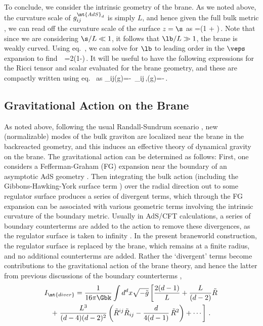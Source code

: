 To conclude, we consider the intrinsic geometry of the brane. As we noted above, the curvature scale of $g_{ij}^{\mt{AdS}_d}$ is simply $L$, and hence given the full bulk metric , we can read off the curvature scale of the surface $z=\s$ as
\beq\label{curve1}
\lb=\left(1 + \right)\,.
\eeq
Note that since we are considering $\s/L\ll 1$, it follows that
$\lb/L\gg 1$, \ie the brane is weakly curved. Using eq.~, we can solve for $\lb$ to leading order in the $\veps$ expansion to find
\beq\label{curve2}
\,\veps\ =2\left(1-\right)\,.
\eeq
It will be useful to have the following expressions for the Ricci tensor and scalar evaluated for the brane geometry, and these are compactly written using eq.~ as
\beq\label{Ricky2}
_{ij}(\tilde g)=-\, _{ij}\,,\qquad {}(\tilde g)=-\,.
\eeq




\subsection{Gravitational Action on the Brane}\label{indyaction}


As noted above, following the usual Randall-Sundrum scenario \cite{Randall:1999vf,Randall:1999ee,Karch:2000ct}, new (normalizable) modes of the bulk graviton are localized near the brane in the backreacted geometry, and this induces an effective theory of dynamical gravity on the brane. The gravitational action can be determined as follows:
First, one considers  a Fefferman-Graham (FG) expansion near the boundary of an asymptotic AdS geometry \cite{FG,Fefferman:2007rka}. Then integrating the bulk action (including the Gibbons-Hawking-York surface term \cite{PhysRevLett.28.1082,Gibbons:1976ue}) over the radial direction out to some regulator surface produces a series of divergent terms, which through the FG expansion can be associated with various geometric terms involving the intrinsic curvature of the boundary metric. Usually in AdS/CFT calculations, a series of boundary counterterms are added to the action to remove these divergences, as the regulator surface is taken to infinity \cite{Emparan:1999pm}. In the present braneworld construction, the regulator surface is replaced by the brane, which remains at a finite radius, and no additional counterterms are added. Rather the `divergent' terms become contributions to the gravitational action of the brane theory, and hence the latter from previous discussions of the boundary counterterms \cite{Emparan:1999pm}, \ie
\begin{multline}\label{diver1}
I_\mt{diver}=\frac{1}{16\pi \Gbk}\int d^dx \sqrt{-\tilde{g}}\left[\frac{2(d-1)}{L}+\frac{L}{(d-2)}\tilde{R}
\right.\\
+\left. \frac{L^3}{(d-4)(d-2)^2} \left(\tilde{R}^{ij}\tilde{R}_{ij}-\frac{d}{4(d-1)}\,\tilde{R}^2\right) +\cdots\right]\,.
\end{multline}

